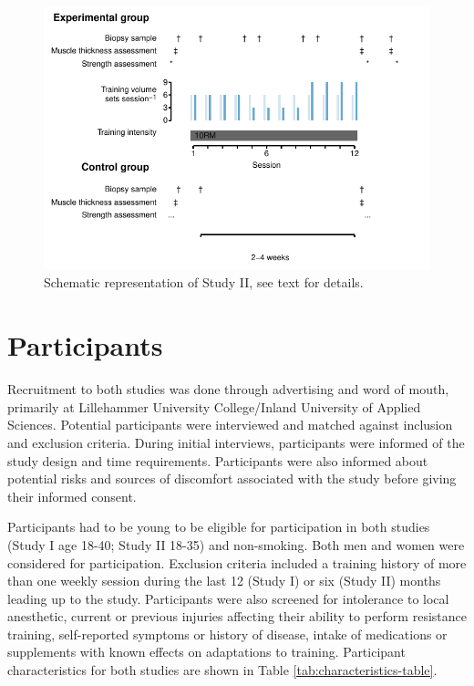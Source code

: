 \documentclass[twoside,10pt]{gihclass} %
\begin{document}
\begin{figure}

{\centering \includegraphics{thesis_files/figure-latex/study2-overview-1} 

}

\caption[Study II, schematic overview]{Schematic representation of Study II, see text for details. }\label{fig:study2-overview}
\end{figure}
\hypertarget{participants}{%
\section{Participants}\label{participants}}

Recruitment to both studies was done through advertising and word of mouth, primarily at Lillehammer University College/Inland University of Applied Sciences. Potential participants were interviewed and matched against inclusion and exclusion criteria. During initial interviews, participants were informed of the study design and time requirements. Participants were also informed about potential risks and sources of discomfort associated with the study before giving their informed consent.

Participants had to be young to be eligible for participation in both studies (Study I age 18-40; Study II 18-35) and non-smoking. Both men and women were considered for participation. Exclusion criteria included a training history of more than one weekly session during the last 12 (Study I) or six (Study II) months leading up to the study. Participants were also screened for intolerance to local anesthetic, current or previous injuries affecting their ability to perform resistance training, self-reported symptoms or history of disease, intake of medications or supplements with known effects on adaptations to training.
Participant characteristics for both studies are shown in Table
\ref{tab:characteristics-table}.
\end{document}
